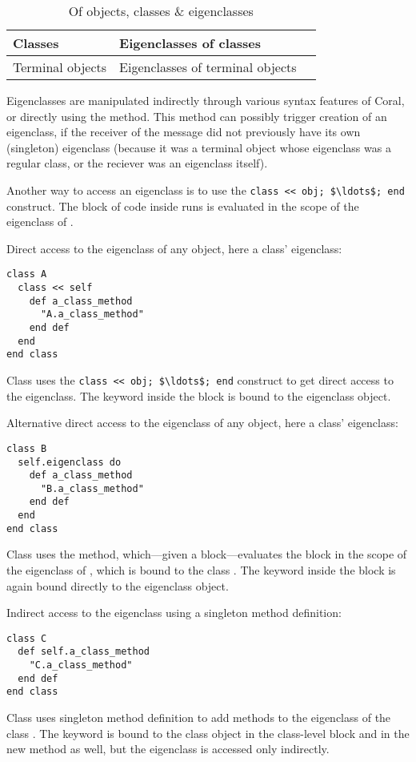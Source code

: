 \begin{table}[ht]
  \centering
  \caption{Of objects, classes \& eigenclasses}
  \renewcommand{\arraystretch}{1.7}
  \begin{tabular}{ | >{\centering}m{3.5cm} | >{\centering}m{3.5cm} | >{\centering\arraybackslash}m{6cm} | }
  	\hline
    Classes & Eigenclasses of classes & \multirow{2}{*}{Eigenclasses of eigenclasses} \\ \cline{1-2}
    Terminal objects & Eigenclasses of terminal objects & \\
    \hline
  \end{tabular}
\end{table}

Eigenclasses are manipulated indirectly through various syntax features of Coral, or directly using the  method. This method can possibly trigger creation of an eigenclass, if the receiver of the  message did not previously have its own (singleton) eigenclass (because it was a terminal object whose eigenclass was a regular class, or the reciever was an eigenclass itself). 

Another way to access an eigenclass is to use the \lstinline!class << obj; $\ldots$; end! construct. The block of code inside runs is evaluated in the scope of the eigenclass of . 

\example Direct access to the eigenclass of any object, here a class' eigenclass:
\begin{lstlisting}
class A
  class << self
    def a_class_method
      "A.a_class_method"
    end def
  end
end class
\end{lstlisting}
Class  uses the \lstinline!class << obj; $\ldots$; end! construct to get direct access to the eigenclass. The keyword  inside the block is bound to the eigenclass object. 

\example Alternative direct access to the eigenclass of any object, here a class' eigenclass:
\begin{lstlisting}
class B
  self.eigenclass do
    def a_class_method
      "B.a_class_method"
    end def
  end
end class
\end{lstlisting}
Class  uses the  method, which---given a block---evaluates the block in the scope of the eigenclass of , which is bound to the class . The keyword  inside the block is again bound directly to the eigenclass object. 

\example Indirect access to the eigenclass using a singleton method definition:
\begin{lstlisting}
class C
  def self.a_class_method
    "C.a_class_method"
  end def
end class
\end{lstlisting}
Class  uses singleton method definition to add methods to the eigenclass of the class . The keyword  is bound to the class object in the class-level block and in the new method as well, but the eigenclass is accessed only indirectly. 

